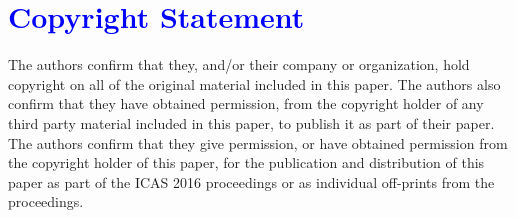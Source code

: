 \documentclass[12pt, conference, a4paper, twoside]{IEEEconf_mod}
\begin{document}
\section*{\textcolor{blue}{Copyright Statement}}

\noindent \small {The authors confirm that they, and/or their company or organization, hold copyright on all of the original material included in this paper. The authors also confirm that they have obtained permission, from the copyright holder of any third party material included in this paper, to publish it as part of their paper. The authors confirm that they give permission, or have obtained permission from the copyright holder of this paper, for the publication and distribution of this paper as part of the ICAS 2016 proceedings or as individual off-prints from the proceedings.}

\end{document}

